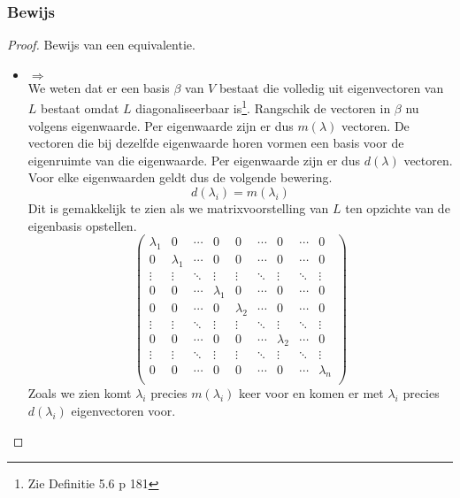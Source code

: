 \documentclass[lineaire_algebra_oplossingen.tex]{subfiles}
\begin{document}
\subsubsection*{Bewijs}
\begin{proof}
Bewijs van een equivalentie.
\begin{itemize}
\item $\Rightarrow$\\
We weten dat er een basis $\beta$ van $V$ bestaat die volledig uit eigenvectoren van $L$ bestaat omdat $L$ diagonaliseerbaar is\footnote{Zie Definitie 5.6 p 181}. Rangschik de vectoren in $\beta$ nu volgens eigenwaarde. Per eigenwaarde zijn er dus $m(\lambda)$ vectoren. De vectoren die bij dezelfde eigenwaarde horen vormen een basis voor de eigenruimte van die eigenwaarde. Per eigenwaarde zijn er dus $d(\lambda)$ vectoren. Voor elke eigenwaarden geldt dus de volgende bewering.
\[
d(\lambda_i) = m(\lambda_i)
\]
Dit is gemakkelijk te zien als we matrixvoorstelling van $L$ ten opzichte van de eigenbasis opstellen.
\[
\begin{pmatrix}
\lambda_1 & 0 & \cdots & 0 & 0 & \cdots & 0 & \cdots & 0\\
0 & \lambda_1 & \cdots & 0 & 0 & \cdots & 0 & \cdots & 0\\
\vdots & \vdots & \ddots & \vdots & \vdots & \ddots&\vdots & \ddots & \vdots\\
0 & 0 & \cdots & \lambda_1& 0 & \cdots   &0 & \cdots & 0\\
0 & 0 & \cdots & 0 & \lambda_2 & \cdots  &0 & \cdots & 0\\
\vdots & \vdots & \ddots & \vdots & \vdots & \ddots & \vdots & \ddots&\vdots\\
0 & 0 & \cdots & 0 & 0 & \cdots & \lambda_2 & \cdots & 0\\
\vdots & \vdots & \ddots & \vdots & \vdots & \ddots & \vdots & \ddots&\vdots\\
0 & 0 & \cdots & 0 & 0 & \cdots & 0 & \cdots & \lambda_n\\
\end{pmatrix}
\]
Zoals we zien komt $\lambda_i$ precies $m(\lambda_i)$ keer voor en komen er met $\lambda_i$ precies $d(\lambda_i)$ eigenvectoren voor.


\end{itemize}
\end{proof}
\end{document}
